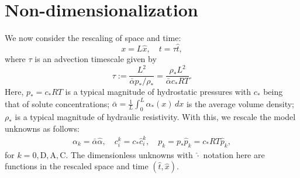 \documentclass{article}
\begin{document}
\section{Non-dimensionalization}

We now consider the rescaling of space and time:
\begin{equation}
    x = L\hat{x},\quad t = \tau\hat{t},
\end{equation}
    where $\tau$ is an advection timescale given by
\begin{equation}
    \tau:=\frac{L^2}{\bar{\alpha}p_*/\rho_*}=\frac{\rho_*L^2}{\bar{\alpha}c_*RT}.
\end{equation}
Here, $p_*=c_*RT$ is a typical magnitude of hydrostatic pressures with $c_*$ being that of solute concentrations; $\bar{\alpha} = \frac{1}{L}\int_0^L\alpha_*(x)\,dx$ is the average volume density; $\rho_*$ is a typical magnitude of hydraulic resistivity.
With this, we rescale the model unknowns as follows:
\begin{gather}
    \alpha_k = \bar{\alpha}\hat{\alpha},\quad c_i^k = c_*\hat{c}_i^k,\quad p_k = p_*\hat{p}_k = c_*RT\hat{p}_k,
\end{gather}
    for $k=0,\mathrm{D},\mathrm{A},\mathrm{C}$.
The dimensionless unknowns with $\hat{\cdot}$ notation here are functions in the rescaled space and time $(\hat{t},\hat{x})$.
\end{document}
